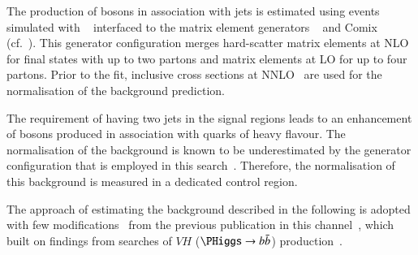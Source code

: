 %
%

The production of \PZ bosons in association with jets is estimated using events
simulated with \SHERPA[2.2.1]~\cite{Bothmann:2019yzt} interfaced to the matrix
element generators
\OPENLOOPS~\cite{Buccioni:2019sur,Cascioli:2011va,Denner:2016kdg} and
Comix~\cite{Gleisberg:2008fv} (cf.\ ). This generator
configuration merges hard-scatter matrix elements at NLO for final states with
up to two partons and matrix elements at LO for up to four partons. Prior to the
fit, inclusive \Zjets cross sections at NNLO~\cite{Anastasiou:2003ds} are used
for the normalisation of the background prediction.

The requirement of having two \btagged jets in the signal regions leads to an
enhancement of \PZ bosons produced in association with quarks of heavy
flavour. The normalisation of the \ZHF background is known to be underestimated
by the generator configuration that is employed in this
search~\cite{STDM-2017-38}. Therefore, the normalisation of this background is
measured in a dedicated control region.


The approach of estimating the \ZHF background described in the following is
adopted with few modifications~\cite{bokan} from the previous publication in
this channel~\cite{HIGG-2016-16-witherratum}, which built on findings from
searches of $VH$ ($\PHiggs \to \bbbar$) production~\cite{HIGG-2016-29}.

